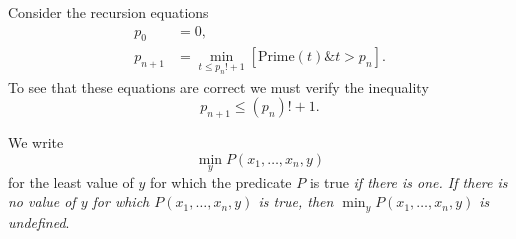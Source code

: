 \documentclass[12pt,a4paper,twoside,openany]{book}
\begin{document}
Consider the recursion equations $$\begin{aligned}p_0&=0,\\p_{n+1}&=\min_{t\le p_n!+1}[\text{Prime}(t)\& t>p_n].\end{aligned}$$ To see that these equations are correct we must verify the inequality
\begin{equation}
    p_{n+1}\le (p_n)!+1.
    \label{eqs.7.1}
\end{equation}

We write $$\min_y P(x_1,\ldots,x_n,y)$$ for the least value of $y$ for which the predicate $P$ is true \textit{if there is one. If there is no value of $y$ for which $P(x_1,\ldots,x_n,y)$ is true, then $\min_yP(x_1,\ldots,x_n,y)$ is undefined}.

\end{document}
